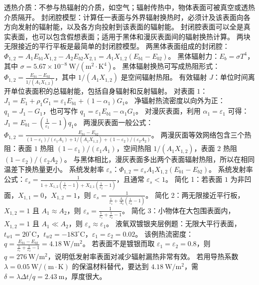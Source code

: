 透热介质：不参与热辐射的介质，如空气；辐射传热中，物体表面可被真空或透热介质隔开。
封闭腔模型：计算任一表面与外界辐射换热时，必须计及该表面向各方向发射的辐射能，以及各方向投射到该表面的辐射能。
封闭腔表面可以全是真实表面，也可以包含假想表面；适用于黑体和漫灰表面间的辐射换热计算。
两块无限接近的平行平板是最简单的封闭腔模型。
两黑体表面组成的封闭腔：$\Phi_{1,2}=A_1E_{b1}X_{1,2}-A_2E_{b2}X_{2,1}=A_1X_{1,2}(E_{b1}-E_{b2})$。
黑体辐射力：$E_b=\sigma T^4$，其中 $\sigma=5.67\times10^{-8}\ \mathrm{W}/(\mathrm{m}^2\cdot\mathrm{K}^4)$。
黑体辐射换热可写成热阻形式：$\Phi_{1,2}=\frac{E_{b1}-E_{b2}}{1/(A_1X_{1,2})}$，其中 $1/(A_1X_{1,2})$ 是空间辐射热阻。
有效辐射 $J$：单位时间离开单位表面积的总辐射能，包括自身辐射和反射辐射。
对表面 $1$：$J_1=E_1+\rho_1G_1=\varepsilon_1E_{b1}+(1-\alpha_1)G_1$。
净辐射热流密度以向外为正：$q_1=J_1-G_1$，也可写作 $q_1=\varepsilon_1E_{b1}-\alpha_1G_1$。
对漫灰表面，利用 $\alpha_1=\varepsilon_1$ 可得：$J_1=E_{b1}-(\frac{1}{\varepsilon_1}-1)q_1$。
两漫灰表面一般公式：$\Phi_{1,2}=\frac{E_{b1}-E_{b2}}{(1-\varepsilon_1)/(\varepsilon_1A_1)+1/(A_1X_{1,2})+(1-\varepsilon_2)/(\varepsilon_2A_2)}$。
两漫灰面等效网络包含三个热阻：表面 $1$ 热阻 $(1-\varepsilon_1)/(\varepsilon_1A_1)$，空间热阻 $1/(A_1X_{1,2})$，表面 $2$ 热阻 $(1-\varepsilon_2)/(\varepsilon_2A_2)$。
与黑体相比，漫灰表面多出两个表面辐射热阻，所以在相同温差下换热量更小。
系统发射率 $\varepsilon_s$：$\Phi_{1,2}=\varepsilon_sA_1X_{1,2}(E_{b1}-E_{b2})$。
系统发射率公式：$\varepsilon_s=\frac{1}{1+X_{1,2}(\frac{1}{\varepsilon_1}-1)+X_{2,1}(\frac{1}{\varepsilon_2}-1)}$，且通常 $\varepsilon_s<1$。
简化 1：若表面 $1$ 为非凹面，$X_{1,1}=0$，$X_{1,2}=1$，则 $\varepsilon_s=\frac{1}{\frac{1}{\varepsilon_1}+\frac{A_1}{A_2}(\frac{1}{\varepsilon_2}-1)}$。
简化 2：两无限接近平行板，$X_{1,2}=1$ 且 $A_1\approx A_2$，则 $\varepsilon_s=\frac{1}{\frac{1}{\varepsilon_1}+\frac{1}{\varepsilon_2}-1}$。
简化 3：小物体在大包围表面内，$X_{1,2}=1$ 且 $A_1\ll A_2$，则 $\varepsilon_s\approx\varepsilon_1$。
液氧双镀银夹层例题：无限大平行表面，$t_{w1}=20^\circ\mathrm{C}$，$t_{w2}=-183^\circ\mathrm{C}$，$\varepsilon_1=\varepsilon_2=0.02$。
该例热流密度：$q=\frac{E_{b1}-E_{b2}}{\frac{1}{\varepsilon_1}+\frac{1}{\varepsilon_2}-1}=4.18\ \mathrm{W}/\mathrm{m}^2$。
若表面不是镀银而取 $\varepsilon_1=\varepsilon_2=0.8$，则 $q=276\ \mathrm{W}/\mathrm{m}^2$，说明低发射率表面对减少辐射漏热非常有效。
若用导热系数 $\lambda=0.05\ \mathrm{W}/(\mathrm{m}\cdot\mathrm{K})$ 的保温材料替代，要达到 $4.18\ \mathrm{W}/\mathrm{m}^2$，需 $\delta=\lambda\Delta t/q=2.43\ \mathrm{m}$，厚度很大。

\divider

